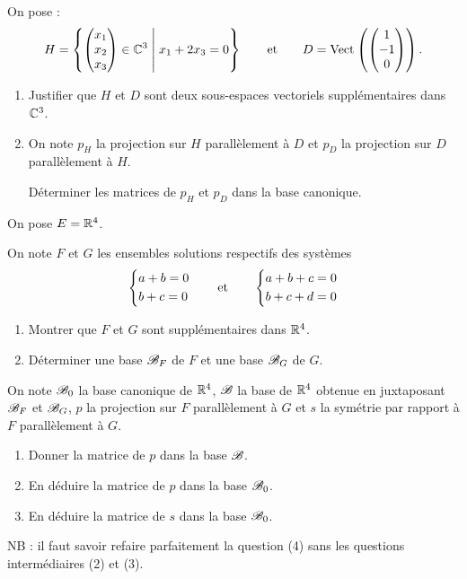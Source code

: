 \begin{exo}
On pose : \[H=\accol{\tcoords{x_1}{x_2}{x_3}\in\C^3\tq x_1+2x_3=0}\qquad\text{et}\qquad D=\Vect{\tcoords{1}{-1}{0}}.\]

\begin{enumerate}
\item Justifier que \(H\) et \(D\) sont deux sous-espaces vectoriels supplémentaires dans \(\mathbb{C}^3\). \\

\item On note \(p_H\) la projection sur \(H\) parallèlement à \(D\) et \(p_D\) la projection sur \(D\) parallèlement à \(H\).

Déterminer les matrices de \(p_H\) et \(p_D\) dans la base canonique.
\end{enumerate}
\end{exo}

\begin{corr}
\end{corr}

\begin{exo}
On pose \(E=\mathbb{R}^4\).

On note \(F\) et \(G\) les ensembles solutions respectifs des systèmes \[\begin{dcases}
a+b=0 \\
b+c=0
\end{dcases}\qquad\text{et}\qquad\begin{dcases}
a+b+c=0 \\
b+c+d=0
\end{dcases}\]

\begin{enumerate}[series=mat2]
\item Montrer que \(F\) et \(G\) sont supplémentaires dans \(\mathbb{R}^4\). \\

\item Déterminer une base \(\mathscr{B}_F\) de \(F\) et une base \(\mathscr{B}_G\) de \(G\).
\end{enumerate}

On note \(\mathscr{B}_0\) la base canonique de \(\mathbb{R}^4\), \(\mathscr{B}\) la base de \(\mathbb{R}^4\) obtenue en juxtaposant \(\mathscr{B}_F\) et \(\mathscr{B}_G\), \(p\) la projection sur \(F\) parallèlement à \(G\) et \(s\) la symétrie par rapport à \(F\) parallèlement à \(G\).

\begin{enumerate}[resume=mat2]
\item Donner la matrice de \(p\) dans la base \(\mathscr{B}\). \\

\item En déduire la matrice de \(p\) dans la base \(\mathscr{B}_0\). \\

\item En déduire la matrice de \(s\) dans la base \(\mathscr{B}_0\).
\end{enumerate}

NB : il faut savoir refaire parfaitement la question (4) sans les questions intermédiaires (2) et (3).
\end{exo}

